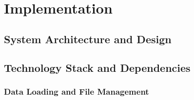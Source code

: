 \chapter{Implementation}\label{chap:chap4}

\section{System Architecture and Design}


\section{Technology Stack and Dependencies}





\subsection{Data Loading and File Management}

